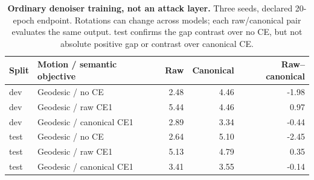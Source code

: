 \begin{table}[t]
\centering\small
\caption{\textbf{Ordinary denoiser training, not an attack layer.} Three seeds, declared 20-epoch endpoint. Rotations can change across models; each raw/canonical pair evaluates the same output. test confirms the gap contrast over no CE, but not absolute positive gap or contrast over canonical CE.}
\label{tab:ordinary}
\begin{tabular}{llrrr}\toprule
Split&Motion / semantic objective&Raw&Canonical&Raw--canonical\\\midrule
dev&Geodesic / no CE&2.48&4.46&-1.98\\
dev&Geodesic / raw CE1&5.44&4.46&0.97\\
dev&Geodesic / canonical CE1&2.89&3.34&-0.44\\
test&Geodesic / no CE&2.64&5.10&-2.45\\
test&Geodesic / raw CE1&5.13&4.79&0.35\\
test&Geodesic / canonical CE1&3.41&3.55&-0.14\\
\bottomrule\end{tabular}\end{table}
